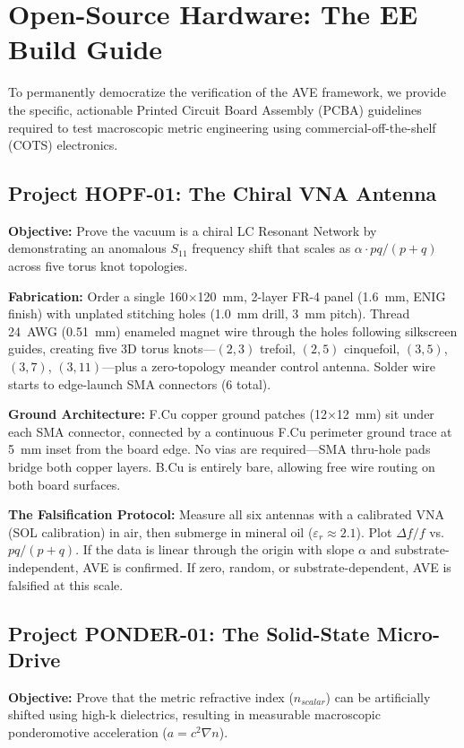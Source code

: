 \section{Open-Source Hardware: The EE Build Guide}

To permanently democratize the verification of the AVE framework, we provide the specific, actionable Printed Circuit Board Assembly (PCBA) guidelines required to test macroscopic metric engineering using commercial-off-the-shelf (COTS) electronics.

\subsection{Project HOPF-01: The Chiral VNA Antenna}
\textbf{Objective:} Prove the vacuum is a chiral LC Resonant Network by demonstrating an anomalous $S_{11}$ frequency shift that scales as $\alpha \cdot pq/(p+q)$ across five torus knot topologies.

\textbf{Fabrication:} Order a single 160$\times$120~mm, 2-layer FR-4 panel (1.6~mm, ENIG finish) with unplated stitching holes (1.0~mm drill, 3~mm pitch). Thread 24~AWG (0.51~mm) enameled magnet wire through the holes following silkscreen guides, creating five 3D torus knots---$(2,3)$ trefoil, $(2,5)$ cinquefoil, $(3,5)$, $(3,7)$, $(3,11)$---plus a zero-topology meander control antenna. Solder wire starts to edge-launch SMA connectors (6 total).

\textbf{Ground Architecture:} F.Cu copper ground patches (12$\times$12~mm) sit under each SMA connector, connected by a continuous F.Cu perimeter ground trace at 5~mm inset from the board edge. No vias are required---SMA thru-hole pads bridge both copper layers. B.Cu is entirely bare, allowing free wire routing on both board surfaces.

\textbf{The Falsification Protocol:} Measure all six antennas with a calibrated VNA (SOL calibration) in air, then submerge in mineral oil ($\varepsilon_r \approx 2.1$). Plot $\Delta f/f$ vs.\ $pq/(p+q)$. If the data is linear through the origin with slope $\alpha$ and substrate-independent, AVE is confirmed. If zero, random, or substrate-dependent, AVE is falsified at this scale.

\subsection{Project PONDER-01: The Solid-State Micro-Drive}
\textbf{Objective:} Prove that the metric refractive index ($n_{scalar}$) can be artificially shifted using high-k dielectrics, resulting in measurable macroscopic ponderomotive acceleration ($a = c^2 \nabla n$).

